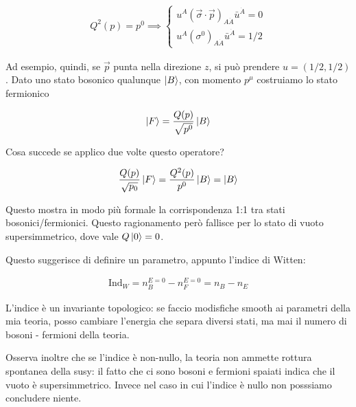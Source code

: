 \documentclass{report}
\begin{document}
\begin{align}
    Q^2(p) = p^0 \implies \begin{cases}
        u^A (\vec{\sigma}\cdot \vec{p})_{A\dot{A}}\bar{u}^{\dot{A}} = 0 \\
        u^A (\sigma^0)_{A\dot{A}}\bar{u}^{\dot{A}} = 1/2
    \end{cases}
\end{align}

Ad esempio, quindi, se \(\vec{p}\) punta nella direzione \(z\), si può prendere \(u = (1/2, 1/2)\). Dato uno stato bosonico qualunque \(\ket{B}\), con momento \(p^\mu\) costruiamo lo stato fermionico 

\begin{align}
    \ket{F} = \frac{Q(p)}{\sqrt{p^0}}\ket{B}
\end{align}

Cosa succede se applico due volte questo operatore? 

\begin{align}
    \frac{Q(p)}{\sqrt{p_0}}\ket{F} = \frac{Q^2(p)}{p^0}\ket{B} = \ket{B}
\end{align}

Questo mostra in modo più formale la corrispondenza 1:1 tra stati bosonici/fermionici. Questo ragionamento però fallisce per lo stato di vuoto supersimmetrico, dove vale \(Q\ket{0} = 0\). 

Questo suggerisce di definire un parametro, appunto l'indice di Witten: 

\begin{align}
    \text{Ind}_W = n_B^{E=0} - n_F^{E=0} = n_B - n_E
\end{align}

L'indice è un invariante topologico: se faccio modisfiche smooth ai parametri della mia teoria, posso cambiare l'energia che separa diversi stati, ma mai il numero di bosoni - fermioni della teoria. 

Osserva inoltre che se l'indice è non-nullo, la teoria non ammette rottura spontanea della susy: il fatto che ci sono bosoni e fermioni spaiati indica che il vuoto è supersimmetrico. Invece nel caso in cui l'indice è nullo non posssiamo concludere niente. 
\end{document}
